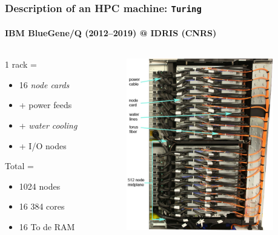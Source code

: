 \documentclass[xcolor={x11names,svgnames,psnames}]{beamer}
\begin{document}
\begin{frame}
  \frametitle{Description of an HPC machine: \texttt{Turing}}
  \framesubtitle{IBM BlueGene/Q (2012--2019) @ IDRIS (CNRS)}
  
  \begin{columns}
    \begin{column}{0.33\textwidth}
      1 rack =
      \begin{itemize}
      \item 16 \textit{node cards}
      \item + power feeds
      \item + \textit{water cooling}
      \item + I/O nodes
      \end{itemize}

      \bigskip
      
      Total =
      \begin{itemize}
      \item 1024 nodes
      \item 16 384 cores
      \item 16 To de RAM
      \end{itemize}
      
    \end{column}
      
    \begin{column}{0.66\textwidth}
      \includegraphics[height=7.5cm]{bgqMidplane}
    \end{column}
  \end{columns}
\end{frame}

\end{document}
